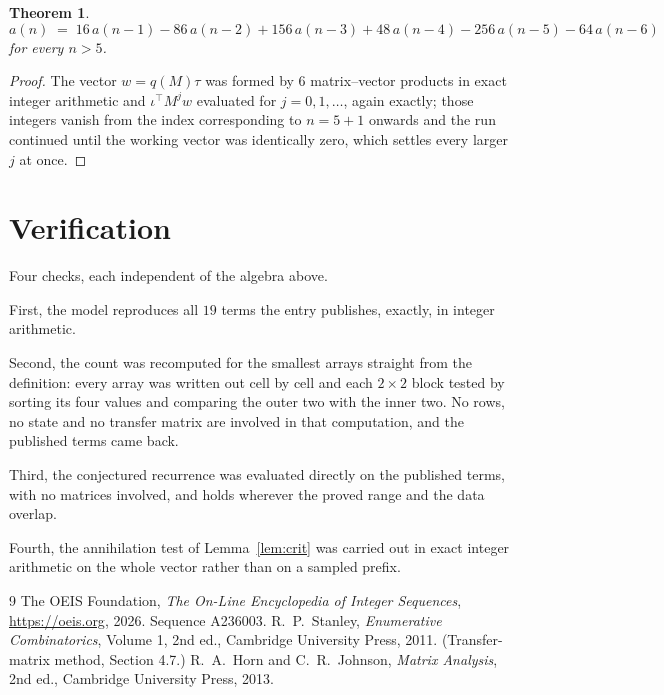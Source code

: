 \documentclass[11pt,a4paper]{article}
\theoremstyle{plain}
\newtheorem{theorem}{Theorem}
\theoremstyle{definition}
\begin{document}
\begin{theorem}
\[
a(n)\;=\;16\,a(n-1) - 86\,a(n-2) + 156\,a(n-3) + 48\,a(n-4) - 256\,a(n-5) - 64\,a(n-6)
\]
for every $n>5$.
\end{theorem}

\begin{proof}
The vector $w=q(M)\tau$ was formed by $6$ matrix--vector products in exact integer
arithmetic and $\iota^{\!\top}M^{j}w$ evaluated for $j=0,1,\dots$, again exactly; those
integers vanish from the index corresponding to $n=5+1$ onwards and the run continued
until the working vector was identically zero, which settles every larger $j$ at once.
\end{proof}

\section{Verification}

Four checks, each independent of the algebra above.

First, the model reproduces all $19$ terms the entry publishes, exactly, in integer
arithmetic.

Second, the count was recomputed for the smallest arrays straight from the definition: every
array was written out cell by cell and each $2\times2$ block tested by sorting its four values
and comparing the outer two with the inner two. No rows, no state and no transfer matrix are
involved in that computation, and the published terms came back.

Third, the conjectured recurrence was evaluated directly on the published terms, with no
matrices involved, and holds wherever the proved range and the data overlap.

Fourth, the annihilation test of Lemma~\ref{lem:crit} was carried out in exact integer
arithmetic on the whole vector rather than on a sampled prefix.

\begin{thebibliography}{9}
 The OEIS Foundation, \emph{The On-Line Encyclopedia of Integer
Sequences}, \url{https://oeis.org}, 2026. Sequence A236003.
 R.~P.~Stanley, \emph{Enumerative Combinatorics}, Volume 1, 2nd ed.,
Cambridge University Press, 2011. (Transfer-matrix method, Section 4.7.)
 R.~A.~Horn and C.~R.~Johnson, \emph{Matrix Analysis}, 2nd ed., Cambridge
University Press, 2013.
\end{thebibliography}
\end{document}
